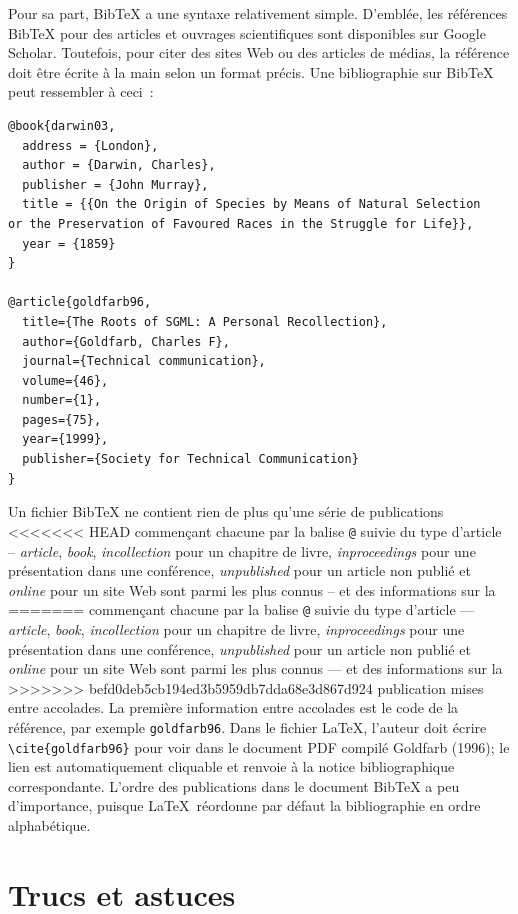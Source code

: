 \documentclass[
  letterpaper,
]{scrbook}
\begin{document}
Pour sa part, BibTeX a une syntaxe relativement simple. D'emblée, les
références BibTeX pour des articles et ouvrages scientifiques sont
disponibles sur Google Scholar. Toutefois, pour citer des sites Web ou
des articles de médias, la référence doit être écrite à la main selon un
format précis. Une bibliographie sur BibTeX peut ressembler à ceci~:

\begin{verbatim}
@book{darwin03,
  address = {London},
  author = {Darwin, Charles},
  publisher = {John Murray},
  title = {{On the Origin of Species by Means of Natural Selection
or the Preservation of Favoured Races in the Struggle for Life}},
  year = {1859}
}

@article{goldfarb96,
  title={The Roots of SGML: A Personal Recollection},
  author={Goldfarb, Charles F},
  journal={Technical communication},
  volume={46},
  number={1},
  pages={75},
  year={1999},
  publisher={Society for Technical Communication}
}
\end{verbatim}

Un fichier BibTeX ne contient rien de plus qu'une série de publications
<<<<<<< HEAD
commençant chacune par la balise \texttt{@} suivie du type d'article --
\emph{article}, \emph{book}, \emph{incollection} pour un chapitre de
livre, \emph{inproceedings} pour une présentation dans une conférence,
\emph{unpublished} pour un article non publié et \emph{online} pour un
site Web sont parmi les plus connus -- et des informations sur la
=======
commençant chacune par la balise \texttt{@} suivie du type d'article ---
\emph{article}, \emph{book}, \emph{incollection} pour un chapitre de
livre, \emph{inproceedings} pour une présentation dans une conférence,
\emph{unpublished} pour un article non publié et \emph{online} pour un
site Web sont parmi les plus connus --- et des informations sur la
>>>>>>> befd0deb5cb194ed3b5959db7dda68e3d867d924
publication mises entre accolades. La première information entre
accolades est le code de la référence, par exemple \texttt{goldfarb96}.
Dans le fichier \LaTeX, l'auteur doit écrire
\texttt{\textbackslash{}cite\{goldfarb96\}} pour voir dans le document
PDF compilé Goldfarb (1996); le lien est automatiquement cliquable et
renvoie à la notice bibliographique correspondante. L'ordre des
publications dans le document BibTeX a peu d'importance, puisque
\LaTeX~réordonne par défaut la bibliographie en ordre alphabétique.

\hypertarget{trucs-et-astuces-1}{%
\section{Trucs et astuces}\label{trucs-et-astuces-1}}
\end{document}
